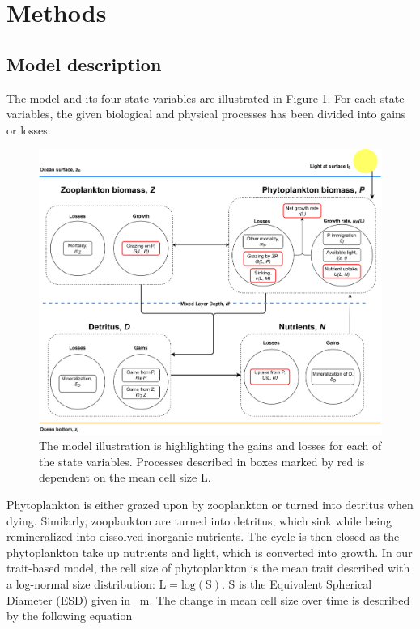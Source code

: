 \section{Methods}
%
\subsection{Model description}
The model and its four state variables are illustrated in Figure \cref{fig:ModelIllust}. For each state variables, the given biological and physical processes has been divided into gains or losses.  
\begin{figure}[H]
\centering
\includegraphics[width=.90\linewidth]{Figures/ModelIllustration_HighRes1.png}
\caption{The model illustration is highlighting the gains and losses for each of the state variables. Processes described in boxes marked by red is dependent on the mean cell size L.}
\label{fig:ModelIllust}
\end{figure}
Phytoplankton is either grazed upon by zooplankton or turned into detritus when dying. Similarly, zooplankton are turned into detritus, which sink while being remineralized into dissolved inorganic nutrients. The cycle is then closed as the phytoplankton take up nutrients and light, which is converted into growth. 
\newline
\newline
In our trait-based model, the cell size of phytoplankton is the mean trait described with a log-normal size distribution: $\mathrm{L=log(S)}$. S is the Equivalent Spherical Diameter (ESD) given in \si{\mu m}. The change in mean cell size over time is described by the following equation
